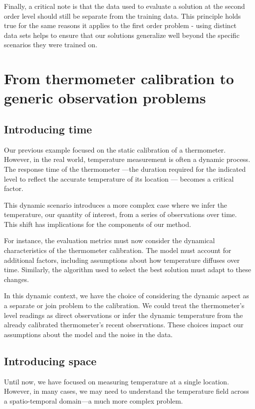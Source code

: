 \begin{bibunit}
Finally, a critical note is that the data used to evaluate a solution at the second order level should still be separate from the training data. This principle holds true for the same reasons it applies to the first order problem - using distinct data sets helps to ensure that our solutions generalize well beyond the specific scenarios they were trained on.

\section{From thermometer calibration to generic observation problems}
\subsection{Introducing time}
Our previous example focused on the static calibration of a thermometer. However, in the real world, temperature measurement is often a dynamic process. The response time of the thermometer —the duration required for the indicated level to reflect the accurate temperature of its location — becomes a critical factor.

This dynamic scenario introduces a more complex case where we infer the temperature, our quantity of interest, from a series of observations over time. This shift has implications for the components of our method.

For instance, the evaluation metrics must now consider the dynamical characteristics of the thermometer calibration. The model must account for additional factors, including assumptions about how temperature diffuses over time. Similarly, the algorithm used to select the best solution must adapt to these changes.

In this dynamic context, we have the choice of considering the dynamic aspect as a separate or join problem to the calibration. We could treat the thermometer's level readings as direct observations or infer the dynamic temperature from the already calibrated thermometer's recent observations. These choices impact our assumptions about the model and the noise in the data.

\subsection{Introducing space}
Until now, we have focused on measuring temperature at a single location. However, in many cases, we may need to understand the temperature field across a spatio-temporal domain—a much more complex problem.


\end{bibunit}
